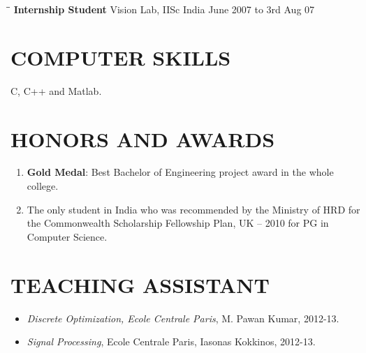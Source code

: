 \documentclass{res}
\begin{document}
\begin{resume}
        \begin{tabbing}%
        \hspace{2.3in}\= \hspace{2.6in}\= \kill %
{\bf Internship Student}  \>Vision Lab, IISc India \> June 2007 to 3rd Aug 07
        \end{tabbing}\vspace{-18pt}
        
       
        \section{COMPUTER SKILLS}          
        C, C++ and Matlab. \\             
\vspace{-10pt}
        \section{HONORS AND AWARDS}  
        \begin{enumerate}
        \item {\bf Gold Medal}: Best Bachelor of Engineering project award in the whole college.
        \item The only student in India who was recommended by the Ministry of HRD for the Commonwealth Scholarship Fellowship Plan, UK – 2010 for PG in Computer Science.

        \end{enumerate}       

        \section{TEACHING ASSISTANT}
        
        \begin{itemize}
        \item \emph{Discrete Optimization, Ecole Centrale Paris}, M. Pawan Kumar, 2012-13.
        \item \emph{Signal Processing}, Ecole Centrale Paris, Iasonas Kokkinos, 2012-13. 
        \end{itemize}
        



\end{resume}
\end{document}

